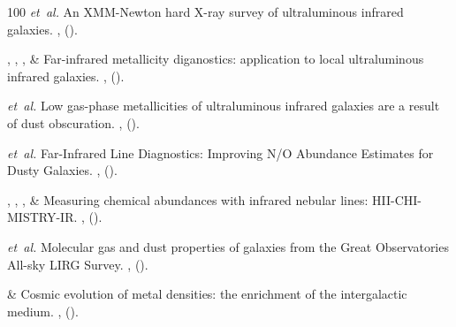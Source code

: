 \documentclass{nature2}
\newcommand{\nastro}{Nat. Astron.} %
\begin{document}
\begin{thebibliography}{100}
 \emph{et~al.}
\newblock An XMM-Newton hard X-ray survey of ultraluminous infrared galaxies.
\newblock \emph{} \textbf{},
   ().

, , ,   \& 
\newblock Far-infrared metallicity diganostics: application to local ultraluminous infrared galaxies.
\newblock \emph{} \textbf{},
   ().

 \emph{et~al.}
\newblock Low gas-phase metallicities of ultraluminous infrared galaxies are a result of dust obscuration.
\newblock \emph{\bibinfo{journal}{\nastro}} \textbf{},
 ().

\emph{et~al.}
\newblock Far-Infrared Line Diagnostics: Improving N/O Abundance Estimates for Dusty Galaxies.
\newblock \emph{} \textbf{},
 ().

, , ,  \& 
\newblock Measuring chemical abundances with infrared nebular lines: HII-CHI-MISTRY-IR.
\newblock \emph{} \textbf{},
 ().

 \emph{et~al.}
\newblock Molecular gas and dust properties of galaxies from the Great Observatories All-sky LIRG Survey.
\newblock \emph{} \textbf{},
 ().

 \& 
\newblock Cosmic evolution of metal densities: the enrichment of the intergalactic medium.
\newblock \emph{} \textbf{},
 ().



\end{thebibliography}
\end{document}
